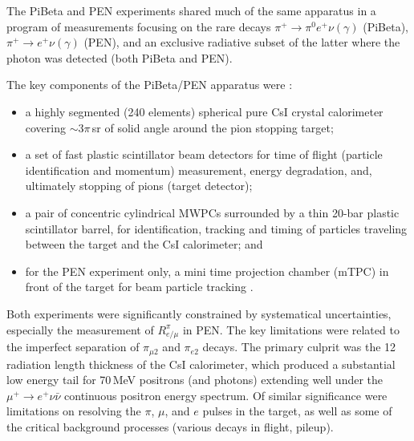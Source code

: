 
The PiBeta
\cite{Pocanic5,Frlez2003vg,Pocanic4,Frlez2003pe,Bychkov2008ws} and
PEN \cite{Pocanic1,Pocanic2,Pocanic6} experiments shared much of the
same apparatus in a program of measurements focusing on the rare decays
$\pi^+ \to \pi^0 e^+ \nu(\gamma)$ (PiBeta), $\pi^+ \to e^+ \nu(\gamma)$
(PEN), and an exclusive radiative subset of the latter where the photon
was detected (both PiBeta and PEN).

The key components of the PiBeta/PEN apparatus were \cite{Frlez2003vg}:
\begin{itemize}
  \item a highly segmented (240 elements) spherical pure CsI crystal
    calorimeter covering $\sim 3\pi$\,sr of solid angle around
    the pion stopping target;

  \item a set of fast plastic scintillator beam detectors for time of
    flight (particle identification and momentum) measurement, energy
    degradation, and, ultimately stopping of pions (target detector);

  \item a pair of concentric cylindrical MWPCs surrounded by a thin
    20-bar plastic scintillator barrel, for identification, tracking and
    timing of particles traveling between the target and the CsI
    calorimeter; and

  \item for the PEN experiment only, a mini time projection chamber
    (mTPC) in front of the target for beam particle tracking
    \cite{Pocanic6}.
   
\end{itemize}

Both experiments were significantly constrained by systematical
uncertainties, especially the measurement of $R_{e/\mu}^{\pi}$ in PEN.
The key limitations were related to the imperfect separation of
$\pi_{\mu2}$ and $\pi_{e2}$ decays.  The primary culprit was the 12
radiation length thickness of the CsI calorimeter, which produced a
substantial low energy tail for 70\,MeV positrons (and photons)
extending well under the $\mu^+ \to e^+\nu\bar{\nu}$ continuous positron
energy spectrum.  Of similar significance were limitations on resolving 
the $\pi$, $\mu$, and $e$ pulses in the target, as well as some of the
critical background processes (various decays in flight, pileup).



